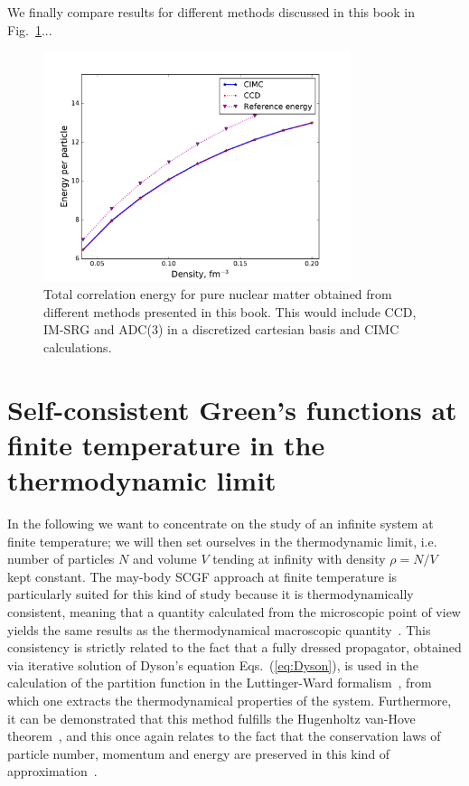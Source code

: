 We finally compare results for different methods discussed in this book in Fig.~\ref{fig:minn_all}...

\begin{figure}[ht]
\begin{center}
\includegraphics[width=0.8\textwidth]{Chapter11-figures/cimcccd.pdf}
\caption{Total correlation energy for pure nuclear matter obtained from different methods presented in this book. This would include CCD, IM-SRG and ADC(3) in
a discretized cartesian basis and CIMC calculations.}
\label{fig:minn_all}
\end{center}
\end{figure}

\fi


\section{Self-consistent Green's functions at finite temperature in the thermodynamic limit}
\label{sec:scgf_finiteT}

In the following we want to concentrate on the study of an infinite system at finite temperature; we will then set ourselves in the thermodynamic limit, i.e. number of particles $N$ and volume $V$ tending at infinity with density $\rho=N/V$ kept constant. The may-body SCGF approach at finite temperature is particularly suited for this kind of study because it is thermodynamically consistent, meaning that a quantity calculated from the microscopic point of view yields the same results as the thermodynamical macroscopic quantity~\cite{ch11_Baym1962}. This consistency is strictly related to the fact that a fully dressed propagator, obtained via iterative solution of Dyson's equation Eqs.~(\ref{eq:Dyson}), is used in the calculation of the partition function in the Luttinger-Ward formalism~\cite{ch11_Luttinger1960}, from which one extracts the thermodynamical properties of the system. Furthermore, it can be demonstrated that this method fulfills the Hugenholtz van-Hove theorem~\cite{ch11_Hugenholtz1958}, and this once again relates to the fact that the conservation laws of particle number, momentum and energy are preserved in this kind of approximation~\cite{ch11_Baym1961,ch11_Baym1962}.


